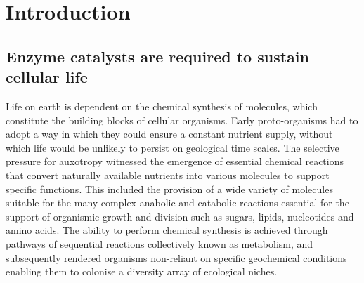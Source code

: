 \chapter{Introduction}

\section{Enzyme catalysts are required to sustain cellular life}
Life on earth is dependent on the chemical synthesis of molecules, which constitute the building blocks of cellular organisms. Early proto-organisms had to adopt a way in which they could ensure a constant nutrient supply, without which life would be unlikely to persist on geological time scales. The selective pressure for auxotropy witnessed the emergence of essential chemical reactions that convert naturally available nutrients into various molecules to support specific functions. This included the provision of a wide variety of molecules suitable for the many complex anabolic and catabolic reactions essential for the support of organismic growth and division such as sugars, lipids, nucleotides and amino acids. The ability to perform chemical synthesis is achieved through pathways of sequential reactions collectively known as metabolism, and subsequently rendered organisms non-reliant on specific geochemical conditions enabling them to colonise a diversity array of ecological niches.

